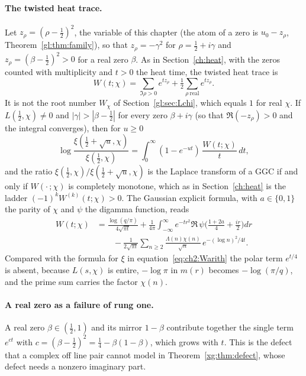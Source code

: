\paragraph{The twisted heat trace.} Let $z_\rho=(\rho-\tfrac12)^2$, the variable of this chapter (the atom of a zero is $u_0-z_\rho$, Theorem~\ref{gl:thm:family}), so that $z_\rho=-\gamma^2$ for $\rho=\tfrac12+i\gamma$ and $z_\rho=(\beta-\tfrac12)^2>0$ for a real zero $\beta$. As in Section~\ref{ch:heat}, with the zeros counted with multiplicity and $t>0$ the heat time, the twisted heat trace is
\[
W(t;\chi)=\sum_{\Im\rho>0}e^{tz_\rho}+\tfrac12\sum_{\rho\ \mathrm{real}}e^{tz_\rho}.
\]
It is not the root number $W_\chi$ of Section~\ref{gl:sec:Lchi}, which equals $1$ for real $\chi$. If $L(\tfrac12,\chi)\ne0$ and $|\gamma|>|\beta-\tfrac12|$ for every zero $\beta+i\gamma$ (so that $\Re(-z_\rho)>0$ and the integral converges), then for $u\ge0$
\[
\log\frac{\xi(\tfrac12+\sqrt u,\chi)}{\xi(\tfrac12,\chi)}=\int_0^\infty(1-e^{-ut})\,\frac{W(t;\chi)}{t}\,dt,
\]
and the ratio $\xi(\tfrac12,\chi)/\xi(\tfrac12+\sqrt u,\chi)$ is the Laplace transform of a GGC if and only if $W(\cdot\,;\chi)$ is completely monotone, which as in Section~\ref{ch:heat} is the ladder $(-1)^kW^{(k)}(t;\chi)>0$. The Gaussian explicit formula, with $a\in\{0,1\}$ the parity of $\chi$ and $\psi$ the digamma function, reads
\begin{equation}\label{gl:eq:ef}
\begin{split}W(t;\chi)&=\frac{\log(q/\pi)}{4\sqrt{\pi t}}+\frac1{4\pi}\int_{-\infty}^{\infty}e^{-tr^2}\Re\,\psi\Big(\frac{1+2a}{4}+\frac{ir}2\Big)dr\\&\qquad-\frac1{2\sqrt{\pi t}}\sum_{n\ge2}\frac{\Lambda(n)\chi(n)}{\sqrt n}\,e^{-(\log n)^2/4t}.\end{split}
\end{equation}
Compared with the formula for $\xi$ in equation~\eqref{eq:ch2:Warith} the polar term $e^{t/4}$ is absent, because $L(s,\chi)$ is entire, $-\log\pi$ in $m(r)$ becomes $-\log(\pi/q)$, and the prime sum carries the factor $\chi(n)$.

\paragraph{A real zero as a failure of rung one.} A real zero $\beta\in(\tfrac12,1)$ and its mirror $1-\beta$ contribute together the single term $e^{ct}$ with $c=(\beta-\tfrac12)^2=\tfrac14-\beta(1-\beta)$, which grows with $t$. This is the defect that a complex off line pair cannot model in Theorem~\ref{xg:thm:defect}, whose defect needs a nonzero imaginary part.

